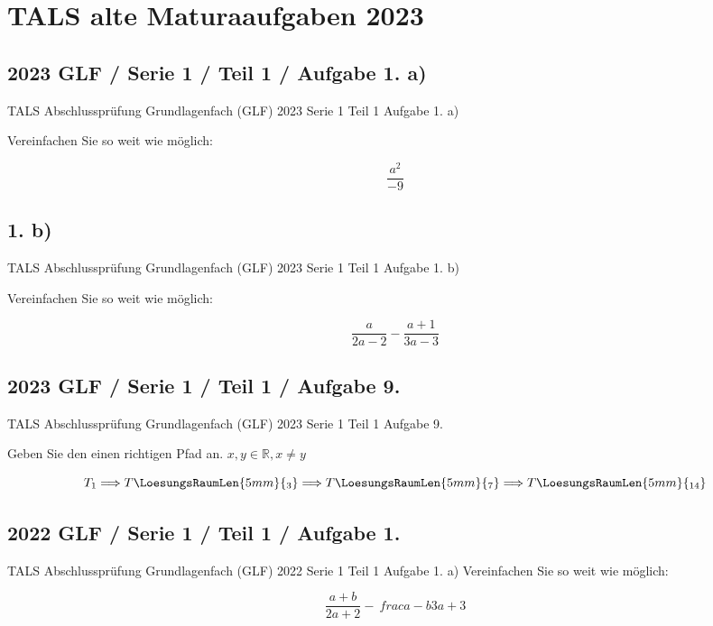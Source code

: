 \section*{TALS alte Maturaaufgaben 2023}
\subsection*{2023 GLF / Serie 1 / Teil 1 / Aufgabe 1. a)}
TALS Abschlussprüfung Grundlagenfach (GLF) 2023 Serie 1 Teil 1 Aufgabe
1. a)

Vereinfachen Sie so weit wie möglich:

$$\frac{a^2}{-9}$$


\subsection*{1. b)}
TALS Abschlussprüfung Grundlagenfach (GLF) 2023 Serie 1 Teil 1 Aufgabe
1. b)

Vereinfachen Sie so weit wie möglich:

$$\frac{a}{2a-2} - \frac{a+1}{3a-3}$$

\subsection*{2023 GLF / Serie 1 / Teil 1 / Aufgabe 9.}
TALS Abschlussprüfung Grundlagenfach (GLF) 2023 Serie 1 Teil 1 Aufgabe
9.

Geben Sie den einen richtigen Pfad an. $x,y \in \mathbb{R}, x\ne y$


$$T_1 \Longrightarrow T\LoesungsRaumLen{5mm}{{}_3} \Longrightarrow
T\LoesungsRaumLen{5mm}{{}_7} \Longrightarrow T\LoesungsRaumLen{5mm}{{}_{14}}$$

\subsection*{2022 GLF / Serie 1 / Teil 1 / Aufgabe 1.}
TALS Abschlussprüfung Grundlagenfach (GLF) 2022 Serie 1 Teil 1 Aufgabe
1. a) Vereinfachen Sie so weit wie möglich:

$$\frac{a+b}{2a+2} - \ frac{a-b}{3a+3}$$

